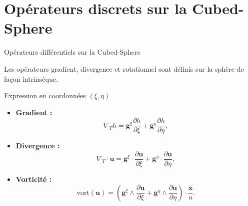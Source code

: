 \documentclass[11pt]{beamer}
\begin{document}
\section{Opérateurs discrets sur la Cubed-Sphere}
\begin{frame}{Opérateurs différentiels sur la Cubed-Sphere}
\begin{exampleblock}{}
Les opérateurs gradient, divergence et rotationnel sont définis sur la sphère de façon intrinsèque.
\end{exampleblock}
\begin{block}{Expression en coordonnées $(\xi, \eta)$}
\begin{itemize}
\item \textbf{Gradient :}
$$
\nabla_T h = \mathbf{g}^{\xi} \dfrac{\partial h}{\partial \xi} + \mathbf{g}^{\eta} \dfrac{\partial h}{\partial \eta},
$$
\item \textbf{Divergence :}
$$
\nabla_T \cdot \mathbf{u} = \mathbf{g}^{\xi} \cdot \dfrac{\partial \mathbf{u}}{\partial \xi} + \mathbf{g}^{\eta} \cdot \dfrac{\partial \mathbf{u}}{\partial \eta},
$$
\item \textbf{Vorticité :}
$$
\text{vort}(\mathbf{u}) = \left( \mathbf{g}^{\xi} \wedge \dfrac{\partial \mathbf{u}}{\partial \xi} + \mathbf{g}^{\eta} \wedge \dfrac{\partial \mathbf{u}}{\partial \eta} \right) \cdot \dfrac{\mathbf{x}}{a}.
$$
\end{itemize}
\end{block}
\end{frame}
\end{document}
